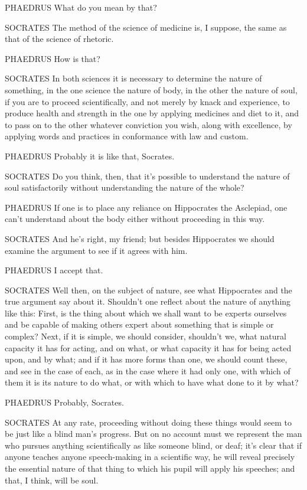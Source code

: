 PHAEDRUS What do you mean by that?

 SOCRATES The method of the science of medicine is, I suppose,
the same as that of the science of rhetoric.

PHAEDRUS How is that?

SOCRATES In both sciences it is necessary to determine the 
nature of something, in the one science the nature of body, in the other
the nature of soul, if you are to proceed scientifically, and not merely
by knack and experience,
to produce health and strength in the one by applying medicines and diet
to it, and to pass on to the other whatever conviction you wish, along
with excellence, by applying
words and practices in
conformance with law and custom.

 PHAEDRUS Probably it is like that, Socrates.

 SOCRATES Do you think, then, that it's possible to understand
the nature of soul satisfactorily without understanding the nature of
the whole?

PHAEDRUS If one is to place any reliance on Hippocrates the
Asclepiad, one can't
understand about the body either  without proceeding in this
way.

SOCRATES And he's right, my friend; but besides Hippocrates we should
examine the argument to
see if it agrees with him.

PHAEDRUS I accept that.

SOCRATES Well then, on the subject of nature, see what 
Hippocrates and the true argument say about it. Shouldn't one 
reflect about the nature of anything like this: First, is the thing
about which we shall want to be experts ourselves and be capable of
making others expert about something that is simple or complex? Next, if
it is simple, we should consider, shouldn't  we, what natural
capacity it has for acting, and on what, or what capacity it has for
being acted upon, and by what; and if it has more
forms than one, we
should count these, and see in the case of each, as in the case where it
had only one, with which of them it is its nature to do what, or with
which to have what done to it by what?

PHAEDRUS Probably, Socrates.

SOCRATES At any rate, proceeding without doing these things would seem
to be just like a blind man's progress. But on no  account must
we represent the man who pursues anything scientifically as like someone
blind, or deaf; it's clear that if anyone teaches anyone speech-making
in a scientific way, he will reveal precisely the essential nature of
that thing to which his pupil will apply his speeches; and that, I
think, will be soul. 

